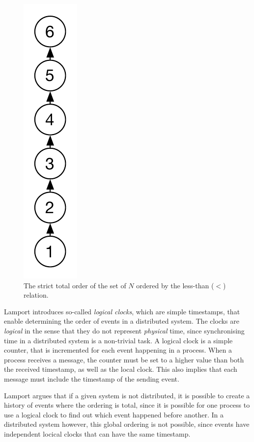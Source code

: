 \begin{figure}[H]
\begin{minipage}{0.45\textwidth}
			\includegraphics[height=\textheight/5]{2background/images/strict-total.pdf}
		\caption{The strict total order of the set of $N$ ordered by the less-than ($<$) relation.}
		\label{fig:background:strict-total}
		\end{minipage}
		\end{figure}
		
		\newpar Lamport introduces so-called \textit{logical clocks}, which are simple timestamps, that enable determining the order of events in a distributed system. The clocks are \textit{logical} in the sense that they do not represent \textit{physical} time, since synchronising time in a distributed system is a non-trivial task. A logical clock is a simple counter, that is incremented for each event happening in a process. When a process receives a message, the counter must be set to a higher value than both the received timestamp, as well as the local clock. This also implies that each message must include the timestamp of the sending event.
		
		\newpar Lamport argues that if a given system is not distributed, it is possible to create a history of events where the ordering is total, since it is possible for one process to use a logical clock to find out which event happened before another. In a distributed system however, this global ordering is not possible, since events have independent locical clocks that can have the same timestamp.
		
